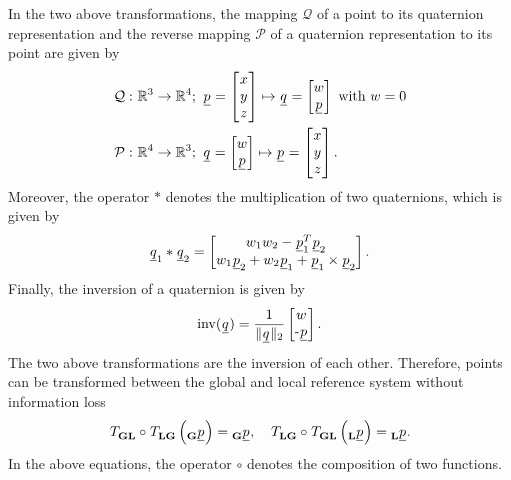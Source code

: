 In the two above transformations,
the mapping $\mathcal{Q}$
of a point to its quaternion representation 
and the reverse mapping $\mathcal{P}$ 
of a quaternion representation to its point  
are given by
\begin{align}
    \mathcal{Q}
    :\ 
    & \mathbb{R}^3 \rightarrow \mathbb{R}^4
    ;\
    \pos[]{}{}{}{} = \begin{bmatrix} \x[]{}{}{}{} \\ \y[]{}{}{}{} \\ \z[]{}{}{}{} \end{bmatrix} 
    \mapsto
    \quat[]{}{}{}{} = \begin{bmatrix} w \\ \underline p \end{bmatrix} 
    \text{ with } w = 0
    \nonumber \\
    \mathcal{P}
    :\ 
    &\mathbb{R}^4 \rightarrow \mathbb{R}^3
    ;\
    \quat[]{}{}{}{} = \begin{bmatrix} w \\ \underline p \end{bmatrix} 
    \mapsto
    \pos[]{}{}{}{} = \begin{bmatrix} \x[]{}{}{}{} \\ \y[]{}{}{}{} \\ \z[]{}{}{}{} \end{bmatrix}.
\end{align}
Moreover, the operator $*$ denotes the multiplication of two quaternions, which is given by
\begin{align}
    \quat[]{}{1}{}{} * \quat[]{}{2}{}{}
    = 
    \begin{bmatrix}
        w_1 w_2 - \pos[]{T}{1}{}{} \pos[]{}{2}{}{}\\ 
        w_1 \pos[]{}{2}{}{} + w_2 \pos[]{}{1}{}{} + \pos[]{}{1}{}{} \times \pos[]{}{2}{}{}
    \end{bmatrix}.
\end{align}
Finally, the inversion of a quaternion is given by
\begin{align}
    \mathrm{inv}(\quat[]{}{}{}{}) 
    = 
    \frac{1}{\| \quat[]{}{}{}{} \|_2}
    \begin{bmatrix} w \\ \text - \pos[]{}{}{}{} \end{bmatrix}.
\end{align}
The two above transformations are the inversion of each other.
Therefore, points can be transformed between the global and local reference system
without information loss
\begin{equation}
    \trafo[]{}{\grs\lrs}{}{} \circ \trafo[]{}{\lrs\grs}{}{} 
    \left( \pos[]{}{}{\grs}{} \right)
    =
    \pos[]{}{}{\grs}{}
    ,\quad
    \trafo[]{}{\lrs\grs}{}{} \circ \trafo[]{}{\grs\lrs}{}{} 
    \left( \pos[]{}{}{\lrs}{} \right)
    =
    \pos[]{}{}{\lrs}{}.
\end{equation}
In the above equations, the operator $\circ$ denotes the composition of two functions.



